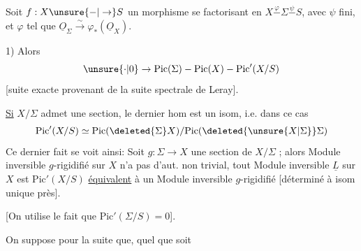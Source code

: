 Soit $f:X\unsure{-|\to} S$ un morphisme se factorisant en $X\overset{\varphi}{-}\Sigma\overset{\psi}{-}S$, avec $\psi$ fini, et $\varphi$ tel que $\underline O_\Sigma\overset{\sim}{\longrightarrow}\varphi_{*}(\underline O_X)$.

1) Alors 
\[
\unsure{\cdot|0}\to\mathrm{Pic}(\Sigma)-\mathrm{Pic}(X)-\mathrm{Pic}'(X/S)
\]
[suite exacte provenant de la suite spectrale de Leray].

 \uline{Si} $X/\Sigma$ admet une section, le dernier hom est un isom, i.e. dans ce cas
\[
\mathrm{Pic}'(X/S)\simeq\mathrm{Pic}(\deleted{\Sigma}X)/\mathrm{Pic}(\deleted{\unsure{X|\Sigma}}\Sigma)
\]
Ce dernier fait se voit ainsi:  Soit $g:\Sigma\longrightarrow X$ une section de $X/\Sigma$ ; alors    Module inversible $g$-rigidifié sur $X$ n'a pas d'aut. non trivial,  tout Module inversible $\underline L$ sur $X$ est  $\mathrm{Pic}'(X/S)$ \uline{équivalent} à  un Module inversible $g$-rigidifié  [déterminé à isom unique près].

[On utilise le fait que $\mathrm{Pic}'(\Sigma/S)=0$].

On suppose pour la suite  que, quel  que soit

